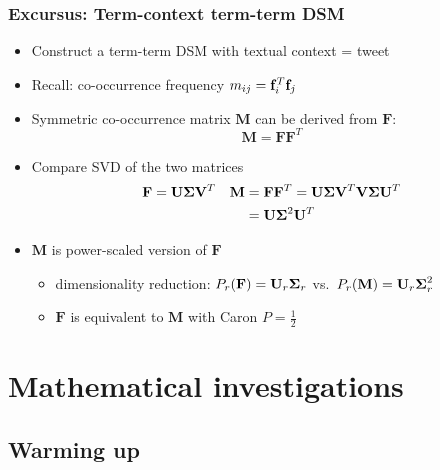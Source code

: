 \documentclass[t]{beamer} %
\begin{document}
\begin{frame}
  \frametitle{Excursus: Term-context \vs term-term DSM}

  \begin{itemize}
  \item Construct a term-term DSM with textual context = tweet
  \item Recall: co-occurrence frequency $m_{ij} = \vf_i^T \vf_j$
  \item<2-> Symmetric co-occurrence matrix $\mathbf{M}$ can be derived from $\mathbf{F}$:
    \[
      \mathbf{M} = \mathbf{F} \mathbf{F}^T
    \]
  \item<3-> Compare SVD of the two matrices
    \begin{align*}
      \mathbf{F} &= \mathbf{U} \boldsymbol{\Sigma} \mathbf{V}^T
      & \mathbf{M} &= \mathbf{F} \mathbf{F}^T = \mathbf{U} \boldsymbol{\Sigma} \mathbf{V}^T \mathbf{V} \boldsymbol{\Sigma} \mathbf{U}^T \\
      && &= \mathbf{U} \boldsymbol{\Sigma}^2 \mathbf{U}^T 
    \end{align*}
  \item<4->[\So] $\mathbf{M}$ is power-scaled version of $\mathbf{F}$
    \begin{itemize}
    \item dimensionality reduction: $P_r(\mathbf{F}) = \mathbf{U}_r \boldsymbol{\Sigma}_r$ vs.\ $P_r(\mathbf{M}) = \mathbf{U}_r \boldsymbol{\Sigma}_r^2$
    \item $\mathbf{F}$ is equivalent to $\mathbf{M}$ with Caron $P = \frac12$
    \end{itemize}
  \end{itemize}
\end{frame}


\section{Mathematical investigations}

\subsection{Warming up}
\end{document}
